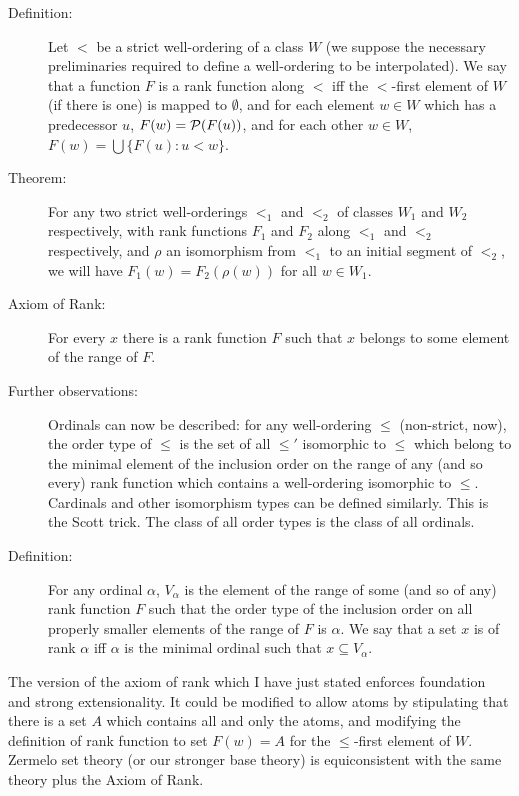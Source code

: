 \documentclass[12pt]{article}
\begin{document}
\begin{description}

\item[Definition:]  Let $<$ be a strict well-ordering of a class $W$ (we suppose the necessary preliminaries required to define a well-ordering to be interpolated).  We say that a function $F$ is a rank function along $<$ iff the $<$-first element of $W$ (if there is one) is mapped to $\emptyset$, and for each element $w \in W$ which has a predecessor $u$, $F(w) = {\cal P}(F(u))$, and for each other $w \in W$, $F(w) = \bigcup\{F(u):u < w\}$.

\item[Theorem:]  For any two strict well-orderings $<_1$ and $<_2$ of classes  $W_1$ and $W_2$ respectively, with rank functions $F_1$ and $F_2$ along $<_1$ and $<_2$ respectively,
and $\rho$ an isomorphism from $<_1$ to an initial segment of $<_2$, we will have $F_1(w) = F_2(\rho(w))$ for all $w \in W_1$.

\item[Axiom of Rank:]  For every $x$ there is a rank function $F$ such that $x$ belongs to some element of the range of $F$.

\item[Further observations:]  Ordinals can now be described:  for any well-ordering $\leq$ (non-strict, now), the order type of $\leq$ is the set of all $\leq'$ isomorphic to $\leq$ which belong to the minimal element of the inclusion order on the range of any (and so every) rank function which contains a well-ordering isomorphic to $\leq$.  Cardinals and other isomorphism types can be defined similarly.  This is the Scott trick.  The class of all order types is the class of all ordinals.

\item[Definition:]  For any ordinal $\alpha$, $V_{\alpha}$ is the element of the range of some (and so of any) rank function $F$ such that the order type of the inclusion order on all properly smaller elements of the range of $F$ is $\alpha$.  We say that a set $x$ is of rank $\alpha$ iff $\alpha$ is the minimal ordinal
such that $x \subseteq V_{\alpha}$.

\end{description}

The version of the axiom of rank which I have just stated enforces foundation and strong extensionality.  It could be modified to allow atoms by stipulating that there is a set $A$ which contains all and only the atoms, and modifying the definition of rank function to set $F(w)=A$ for the $\leq$-first element of $W$.  Zermelo set theory (or our stronger base theory) is equiconsistent with the same theory plus the Axiom of Rank.
\end{document}
